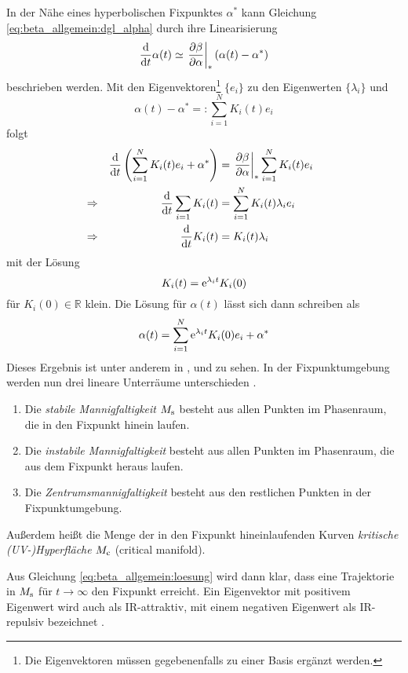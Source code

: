    In der Nähe eines hyperbolischen Fixpunktes $\alpha^*$ kann Gleichung 
    \eqref{eq:beta_allgemein:dgl_alpha} durch ihre Linearisierung
    \begin{equation}
     \frac{\text{d}}{\text{d} t} \alpha(t) \simeq \left.\frac{\partial \beta}{\partial \alpha}\right|_* \left(\alpha(t)-\alpha^*\right) \label{eq:beta_allgemein:beta_linear}
    \end{equation}
     beschrieben werden. Mit den Eigenvektoren\footnote{Die Eigenvektoren 
     müssen gegebenenfalls zu einer Basis ergänzt werden.} $\{e_i\}$ zu den Eigenwerten 
     $\{\lambda_i\}$ und 
     \begin{equation}
      \alpha(t)-\alpha^*=:\sum_{i=1}^N K_i(t) e_i
     \end{equation}
     folgt  
    \begin{align}
     &&\frac{\text{d}}{\text{d} t} \left(\sum\limits_{i=1}^N K_i(t)e_i + \alpha^* \right) &=
     \left.\frac{\partial \beta}{\partial \alpha}\right|_* \sum\limits_{i=1}^N K_i(t) e_i \\
     &\Rightarrow&\frac{\text{d}}{\text{d} t}  \sum\limits_{i=1} K_i(t) &= \sum\limits_{i=1}^N K_i(t) \lambda_i e_i &\\
     &\Rightarrow&  \frac{\text{d}}{\text{d} t} K_i(t) &= K_i(t) \lambda_i & \label{eq:beta_allgemein:K} 
    \end{align}
    mit der Lösung
    \begin{equation}
     K_i(t)=\text{e}^{\lambda_i t} K_i(0) \label{eq:beta_allgemein:K_loesung}
    \end{equation}
    für $K_i(0) \in \mathbb{R}$ klein. Die Lösung für $\alpha(t)$ lässt sich dann schreiben als 
    \begin{equation}
     \alpha(t)=\sum\limits_{i=1}^N \text{e}^{\lambda_i t} K_i(0) e_i +\alpha^* \label{eq:beta_allgemein:loesung}
    \end{equation}
    Dieses Ergebnis ist unter anderem in \cite{Weinberg:1976}, \cite{General_relativity} und 
    \cite{Asymptotic_safety_guaranteed} zu sehen.
    In der Fixpunktumgebung werden nun drei lineare Unterräume unterschieden 
    \cite{Bronstein4}.
    \begin{definition}
     \begin{enumerate}
      \item Die \textit{stabile Mannigfaltigkeit} $M_\text{s}$ besteht aus allen Punkten im Phasenraum, 
      die in den Fixpunkt hinein laufen.
      \item Die \textit{instabile Mannigfaltigkeit} besteht aus allen Punkten im Phasenraum, 
      die aus dem Fixpunkt heraus laufen.
      \item Die \textit{Zentrumsmannigfaltigkeit} besteht aus den restlichen 
      Punkten in der Fix\-punkt\-um\-ge\-bung.
      \end{enumerate}
      Außerdem heißt die Menge der in den Fixpunkt hineinlaufenden Kurven 
      \textit{kritische (UV-)Hyperfläche} $M_\text{c}$ (critical manifold).
    \end{definition}
    Aus Gleichung \eqref{eq:beta_allgemein:loesung} wird dann klar, dass eine Trajektorie in 
    $M_\text{s}$ für $t\to\infty$ den Fixpunkt erreicht. Ein Eigenvektor mit positivem 
    Eigenwert wird auch als IR-attraktiv, mit einem negativen Eigenwert als IR-repulsiv 
    bezeichnet \cite{Weinberg:1976}. 
